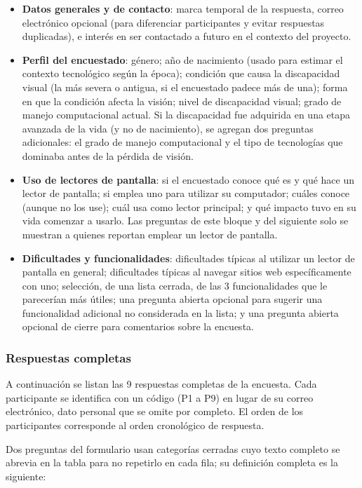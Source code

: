 \begin{itemize}
    \item \textbf{Datos generales y de contacto}: marca temporal de la respuesta, correo electrónico opcional (para diferenciar participantes y evitar respuestas duplicadas), e interés en ser contactado a futuro en el contexto del proyecto.
    \item \textbf{Perfil del encuestado}: género; año de nacimiento (usado para estimar el contexto tecnológico según la época); condición que causa la discapacidad visual (la más severa o antigua, si el encuestado padece más de una); forma en que la condición afecta la visión; nivel de discapacidad visual; grado de manejo computacional actual. Si la discapacidad fue adquirida en una etapa avanzada de la vida (y no de nacimiento), se agregan dos preguntas adicionales: el grado de manejo computacional y el tipo de tecnologías que dominaba antes de la pérdida de visión.
    \item \textbf{Uso de lectores de pantalla}: si el encuestado conoce qué es y qué hace un lector de pantalla; si emplea uno para utilizar su computador; cuáles conoce (aunque no los use); cuál usa como lector principal; y qué impacto tuvo en su vida comenzar a usarlo. Las preguntas de este bloque y del siguiente solo se muestran a quienes reportan emplear un lector de pantalla.
    \item \textbf{Dificultades y funcionalidades}: dificultades típicas al utilizar un lector de pantalla en general; dificultades típicas al navegar sitios web específicamente con uno; selección, de una lista cerrada, de las 3 funcionalidades que le parecerían más útiles; una pregunta abierta opcional para sugerir una funcionalidad adicional no considerada en la lista; y una pregunta abierta opcional de cierre para comentarios sobre la encuesta.
\end{itemize}

\subsubsection{Respuestas completas}

A continuación se listan las 9 respuestas completas de la encuesta. Cada participante se identifica con un código (P1 a P9) en lugar de su correo electrónico, dato personal que se omite por completo. El orden de los participantes corresponde al orden cronológico de respuesta.

Dos preguntas del formulario usan categorías cerradas cuyo texto completo se abrevia en la tabla para no repetirlo en cada fila; su definición completa es la siguiente:

